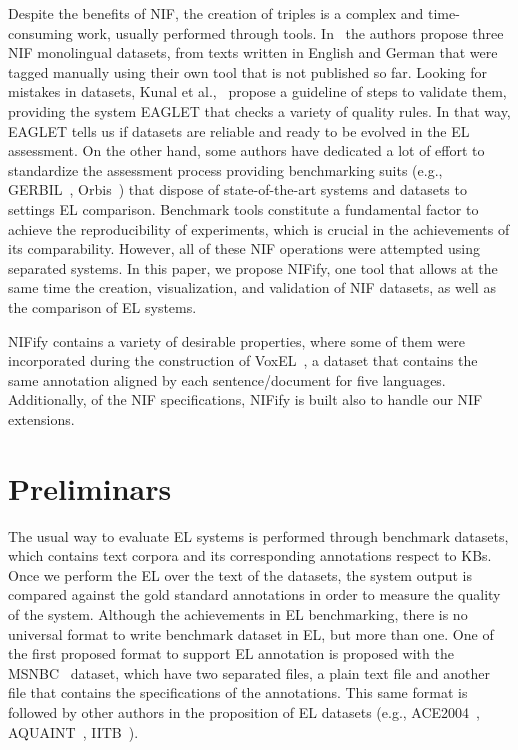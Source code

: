 \documentclass[sigconf]{acmart}
\begin{document}
Despite the benefits of NIF, the creation of triples is a complex and time-consuming work, usually performed through tools. In~\cite{N3} the authors propose three NIF monolingual datasets, from texts written in English and German that were tagged manually using their own tool that is not published so far. Looking for mistakes in datasets,  Kunal et al.,~\cite{Kunal2017} propose a guideline of steps to validate them, providing the system EAGLET that checks a variety of quality rules. In that way, EAGLET tells us if datasets are reliable and ready to be evolved in the EL assessment. On the other hand, some authors have dedicated a lot of effort to standardize the assessment process providing benchmarking suits (e.g., GERBIL~\cite{gerbil-2015}, Orbis~\cite{Orbis2018}) that dispose of state-of-the-art systems and datasets to settings EL comparison. Benchmark tools constitute a fundamental factor to achieve the reproducibility of experiments, which is crucial in the achievements of its comparability. However, all of these NIF operations were attempted using separated systems. In this paper, we propose NIFify, one tool that allows at the same time the creation, visualization, and validation of NIF datasets, as well as the comparison of EL systems. 

NIFify contains a variety of desirable properties, where some of them were incorporated during the construction of VoxEL~\cite{VoxEL2018}, a dataset that contains the same annotation aligned by each sentence/document for five languages. Additionally, of the NIF specifications, NIFify is built also to handle our NIF extensions. 




\section{Preliminars}
\label{sec:nif}


The usual way to evaluate EL systems is performed through benchmark datasets, which contains text corpora and its corresponding annotations respect to KBs. Once we perform the EL over the text of the datasets, the system output is compared against the gold standard annotations in order to measure the quality of the system. Although the achievements in EL benchmarking, there is no universal format to write benchmark dataset in EL, but more than one. One of the first proposed format to support EL annotation is proposed with the MSNBC~\cite{cucerzan2007large} dataset, which have two separated files, a plain text file and another file that contains the specifications of the annotations. This same format is followed by other authors in the proposition of EL datasets (e.g., ACE2004~\cite{aquaint}, AQUAINT~\cite{aquaint}, IITB~\cite{IITB2009}). 
\end{document}
